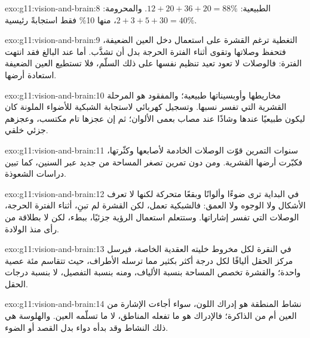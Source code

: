 \begin{solution}{exo:g11:vision-and-brain:8}
الطبيعية: $12 + 20 + 36 + 20 = 88\%$. والمحرومة: $2 + 3 + 5 + 30 = 40\%$،
منها 10\% فقط استجابةً رئيسية.
\end{solution}

\begin{solution}{exo:g11:vision-and-brain:9}
التغطية ترغم القشرة على استعمال دخل العين الضعيفة، فتحفظ وصلاتها وتقوى
أثناء الفترة الحرجة بدل أن تشذَّب. أما عند البالغ فقد انتهت الفترة:
فالوصلات لا تعود تعيد تنظيم نفسها على ذلك السلّم، فلا تستطيع العين
الضعيفة استعادة أرضها.
\end{solution}

\begin{solution}{exo:g11:vision-and-brain:10}
مخاريطها وأوبسيناتها طبيعية؛ والمفقود هو المرحلة القشرية التي تفسر
نسبها. وتسجيل كهربائي لاستجابة الشبكية للأضواء الملونة كان ليكون
طبيعيًا عندها وشاذًا عند مصاب بعمى الألوان؛ ثم إن عجزها تام مكتسب،
وعجزهم جزئي خلقي.
\end{solution}

\begin{solution}{exo:g11:vision-and-brain:11}
سنوات التمرين قوّت الوصلات الخادمة لأصابعها وكثّرتها، فكبّرت أرضها
القشرية. ومن دون تمرين تصغر المساحة من جديد عبر السنين، كما تبين
دراسات الشعوذة.
\end{solution}

\begin{solution}{exo:g11:vision-and-brain:12}
في البداية ترى ضوءًا وألوانًا وبقعًا متحركة لكنها لا تعرف الأشكال ولا
الوجوه ولا العمق: فالشبكية تعمل، لكن القشرة لم تبنِ، أثناء الفترة
الحرجة، الوصلات التي تفسر إشاراتها. وستتعلم استعمال الرؤية جزئيًا،
ببطء، لكن لا بطلاقة من رأى منذ الولادة.
\end{solution}

\begin{solution}{exo:g11:vision-and-brain:13}
في النقرة لكل مخروط خليته العقدية الخاصة، فيرسل مركز الحقل أليافًا لكل
درجة أكثر بكثير مما ترسله الأطراف، حيث تتقاسم مئة عصية  واحدة؛
والقشرة تخصص المساحة بنسبة الألياف، ومنه بنسبة التفصيل، لا بنسبة
درجات الحقل.
\end{solution}

\begin{solution}{exo:g11:vision-and-brain:14}
نشاط المنطقة هو إدراك اللون، سواء أجاءت الإشارة من العين أم من
الذاكرة؛ فالإدراك هو ما تفعله المناطق، لا ما تسلّمه العين. والهلوسة
هي ذلك النشاط وقد بدأه دواء بدل القصد أو الضوء.
\end{solution}

